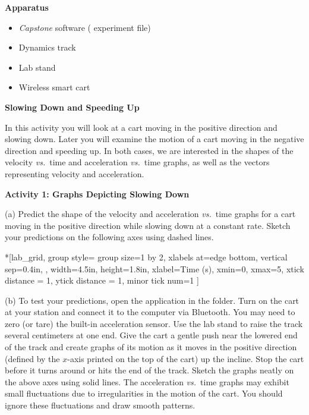 \medskip
\textbf{Apparatus }

\begin{itemize} 
\item \textit{Capstone} software ( experiment file)
\item Dynamics track 
\item Lab stand
\item Wireless smart cart
\end{itemize}

\medskip
\textbf{Slowing Down and Speeding Up }

In this activity you will look at a cart moving in the positive direction and slowing down. Later you will examine the motion of a cart moving in the negative direction and speeding up. In both cases, we are interested in the shapes of the velocity \textit{vs.}~time and acceleration \textit{vs.}~time graphs, as well as the vectors representing velocity and acceleration. 

\pagebreak[2]
\textbf{Activity 1: Graphs Depicting Slowing Down} 

(a) Predict the shape of the velocity and acceleration \textit{vs.}~time graphs
for a cart moving in the positive direction while slowing down at a constant rate. Sketch your predictions on the following axes using dashed lines.

\begin{lab_groupplot}*{}[lab_grid,
	group style={
		group size=1 by 2,
		xlabels at=edge bottom,
		vertical sep=0.4in,
		},
	width=4.5in,  height=1.8in,
	xlabel=Time (s),
	xmin=0, xmax=5,
	xtick distance = 1, 
	ytick distance = 1, 
	minor tick num=1
	]
\nextgroupplot[
	ymin=-1,ymax=1, 
	ylabel={Velocity (m/s)},
	]
\nextgroupplot[
	ymin=-1,ymax=1, 
	ylabel={Acceleration (m/s$^2$)},
	]
\end{lab_groupplot}

(b) To test your predictions, open the  application in the \filename{\coursefolder} folder. Turn on the cart at your station and connect it to the computer via Bluetooth. You may need to zero (or tare) the built-in acceleration sensor. Use the lab stand to raise the track several centimeters at one end. Give the cart a gentle push near the lowered end of the track and create graphs of its motion as it moves in the positive direction (defined by the $x$-axis printed on the top of the cart) up the incline. Stop the cart before it turns around or hits the end of the track. Sketch the graphs neatly on the above axes using solid lines. The acceleration \textit{vs.}~time graphs may exhibit small fluctuations due to irregularities in the motion of the cart. You should ignore these fluctuations and draw smooth patterns.

